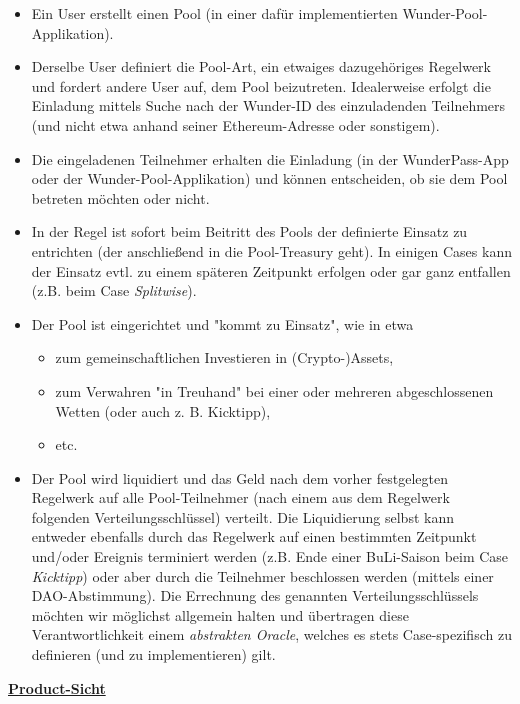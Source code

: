 \begin{itemize}
  \item Ein User erstellt einen Pool (in einer dafür implementierten Wunder-Pool-Applikation).
  \item Derselbe User definiert die Pool-Art, ein etwaiges dazugehöriges Regelwerk und fordert andere User auf, dem Pool beizutreten. Idealerweise erfolgt die Einladung mittels Suche nach der Wunder-ID des einzuladenden Teilnehmers (und nicht etwa anhand seiner Ethereum-Adresse oder sonstigem).
  \item Die eingeladenen Teilnehmer erhalten die Einladung (in der WunderPass-App oder der Wunder-Pool-Applikation) und können entscheiden, ob sie dem Pool betreten möchten oder nicht. 
  \item In der Regel ist sofort beim Beitritt des Pools der definierte Einsatz zu entrichten (der anschließend in die Pool-Treasury geht). In einigen Cases kann der Einsatz evtl. zu einem späteren Zeitpunkt erfolgen oder gar ganz entfallen (z.B. beim Case \textit{Splitwise}).
  \item Der Pool ist eingerichtet und "kommt zu Einsatz", wie in etwa
  \begin{itemize}
  	\item zum gemeinschaftlichen Investieren in (Crypto-)Assets,
  	\item zum Verwahren "in Treuhand" bei einer oder mehreren abgeschlossenen Wetten (oder auch z. B. Kicktipp),
  	\item etc.
  \end{itemize}
  \item Der Pool wird liquidiert und das Geld nach dem vorher festgelegten Regelwerk auf alle Pool-Teilnehmer (nach einem aus dem Regelwerk folgenden Verteilungsschlüssel) verteilt. Die Liquidierung selbst kann entweder ebenfalls durch das Regelwerk auf einen bestimmten Zeitpunkt und/oder Ereignis terminiert werden (z.B. Ende einer BuLi-Saison beim Case \textit{Kicktipp}) oder aber durch die Teilnehmer beschlossen werden (mittels einer DAO-Abstimmung). Die Errechnung des genannten Verteilungsschlüssels möchten wir möglichst allgemein halten und übertragen diese Verantwortlichkeit einem \textit{abstrakten Oracle}, welches es stets Case-spezifisch zu definieren (und zu implementieren) gilt.
\end{itemize}

\vspace{0.2cm}

\underline{\textbf{Product-Sicht}}

